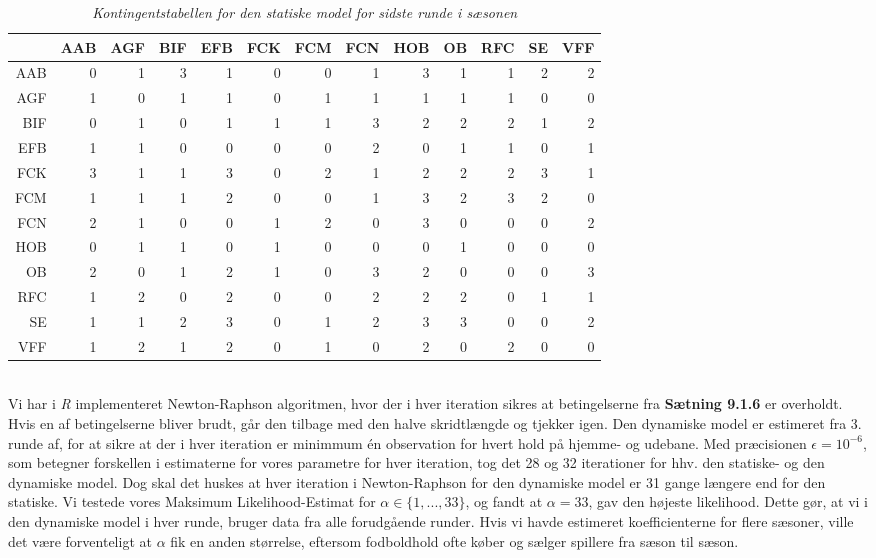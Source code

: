 \documentclass[11pt,a4paper]{article}
\begin{document}
\begin{table}[ht]
\centering
\begin{adjustbox}{max width=\textwidth}
\begin{tabular}{|rrrrrrrrrrrrr|}
  \hline
 & AAB & AGF & BIF & EFB & FCK & FCM & FCN & HOB & OB & RFC & SE & VFF \\ 
  \hline
AAB &   0 &   1 &   3 &   1 &   0 &   0 &   1 &   3 &   1 &   1 &   2 &   2 \\ 
  AGF &   1 &   0 &   1 &   1 &   0 &   1 &   1 &   1 &   1 &   1 &   0 &   0 \\ 
  BIF &   0 &   1 &   0 &   1 &   1 &   1 &   3 &   2 &   2 &   2 &   1 &   2 \\ 
  EFB &   1 &   1 &   0 &   0 &   0 &   0 &   2 &   0 &   1 &   1 &   0 &   1 \\ 
  FCK &   3 &   1 &   1 &   3 &   0 &   2 &   1 &   2 &   2 &   2 &   3 &   1 \\ 
  FCM &   1 &   1 &   1 &   2 &   0 &   0 &   1 &   3 &   2 &   3 &   2 &   0 \\ 
  FCN &   2 &   1 &   0 &   0 &   1 &   2 &   0 &   3 &   0 &   0 &   0 &   2 \\ 
  HOB &   0 &   1 &   1 &   0 &   1 &   0 &   0 &   0 &   1 &   0 &   0 &   0 \\ 
  OB &   2 &   0 &   1 &   2 &   1 &   0 &   3 &   2 &   0 &   0 &   0 &   3 \\ 
  RFC &   1 &   2 &   0 &   2 &   0 &   0 &   2 &   2 &   2 &   0 &   1 &   1 \\ 
  SE &   1 &   1 &   2 &   3 &   0 &   1 &   2 &   3 &   3 &   0 &   0 &   2 \\ 
  VFF &   1 &   2 &   1 &   2 &   0 &   1 &   0 &   2 &   0 &   2 &   0 &   0 \\ 
   \hline
\end{tabular}
\end{adjustbox}
\caption{\label{tab:Kontingentstabel}\textit{Kontingentstabellen for den statiske model for sidste runde i sæsonen}}
\end{table}
\\Vi har i \textit{R} implementeret Newton-Raphson algoritmen, hvor der i hver iteration sikres at betingelserne fra \textbf{Sætning 9.1.6} er overholdt. Hvis en af betingelserne bliver brudt, går den tilbage med den halve skridtlængde og tjekker igen. Den dynamiske model er estimeret fra 3. runde af, for at sikre at der i hver iteration er minimmum én observation for hvert hold på hjemme- og udebane. Med præcisionen $\epsilon = 10^{-6}$, som betegner forskellen i estimaterne for vores parametre for hver iteration, tog det 28 og 32 iterationer for hhv. den statiske- og den dynamiske model. Dog skal det huskes at hver iteration i Newton-Raphson for den dynamiske model er 31 gange længere end for den statiske. Vi testede vores Maksimum Likelihood-Estimat for $\alpha \in \{1,...,33\}$, og fandt at $\alpha=33$, gav den højeste likelihood. Dette gør, at vi i den dynamiske model i hver runde, bruger data fra alle forudgående runder. Hvis vi havde estimeret koefficienterne for flere sæsoner, ville det være forventeligt at $\alpha$ fik en anden størrelse, eftersom fodboldhold ofte køber og sælger spillere fra sæson til sæson.
\end{document}
